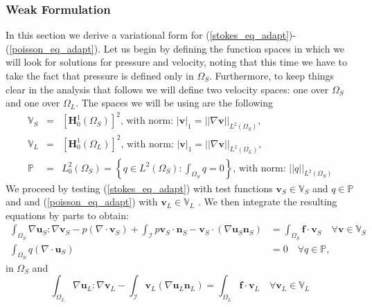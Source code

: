 \documentclass[12pt,a4paper]{article}
\theoremstyle{definition}
\begin{document}
\subsubsection{Weak Formulation}
In this section we derive a variational form for (\ref{stokes_eq_adapt})-(\ref{poisson_eq_adapt}).  Let us begin by defining the function spaces in which we will look for solutions for pressure and velocity, noting that this time we have to take the fact that pressure is defined only in $\Omega_S$.  Furthermore, to keep things clear in the analysis that follows we will define two velocity spaces: one over $\Omega_S$ and one over $\Omega_L$.  The spaces we will be using are the following
\begin{eqnarray}\label{fspace_V1}
\mathbb{V}_S&=&\left[\textbf{H}^1_0\left(\Omega_S\right)\right]^2\text{, with norm: } \left|\textbf{v}\right|_{1}=\left|\left|\nabla\textbf{v}\right|\right|_{L^2\left(\Omega_S\right)}, \\ \label{fspace_V2}
\mathbb{V}_L&=&\left[\textbf{H}^1_0\left(\Omega_L\right)\right]^2\text{, with norm: } \left|\textbf{v}\right|_{1}=\left|\left|\nabla\textbf{v}\right|\right|_{L^2\left(\Omega_L\right)}, \\\label{fspace_P1}
\mathbb{P}&=&L^2_0\left(\Omega_S\right)=\left\lbrace q\in L^2\left(\Omega_S\right): \int_{\Omega_S} q=0\right\rbrace\text{, with norm: } \left|\left|q\right|\right|_{L^2\left(\Omega_S\right)}
\end{eqnarray}
We proceed by testing (\ref{stokes_eq_adapt})  with test functions $\textbf{v}_S\in \mathbb{V}_S$ and $q\in \mathbb{P}$  and and (\ref{poisson_eq_adapt}) with $\textbf{v}_L\in\mathbb{V}_L$ . We then integrate the resulting equations by parts to obtain:
\begin{equation}\label{weak_stokes_1}
\begin{aligned}
\int_{\Omega_S}\nabla \textbf{u}_S : \nabla \textbf{v}_S-p\left(\nabla \cdot \textbf{v}_S\right) +\int_{\mathcal{I}} p\textbf{v}_S\cdot \textbf{n}_S-\textbf{v}_S\cdot\left(\nabla\textbf{u}_S\textbf{n}_S\right) &=\int_{\Omega_S}\textbf{f}\cdot \textbf{v}_S  \quad \forall  \textbf{v}\in \mathbb{V}_S\\
\int_{\Omega_S}q\left(\nabla \cdot \textbf{u}_S\right) &= 0\quad \forall q\in \mathbb{P},
\end{aligned}
\end{equation}
in $\Omega_S$ and
\begin{equation}\label{weak_poisson}
\int_{\Omega_L}\nabla \textbf{u}_L : \nabla \textbf{v}_L - \int_{\mathcal{I}} \textbf{v}_L \left(\nabla\textbf{u}_L\textbf{n}_L\right)= 
\int_{\Omega_L}\textbf{f}\cdot \textbf{v}_L  \quad \forall  \textbf{v}_L\in \mathbb{V}_L
\end{equation}
\end{document}
